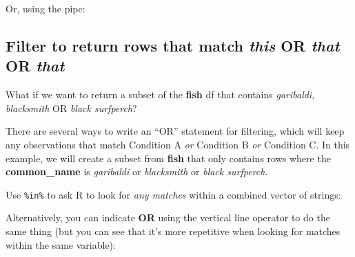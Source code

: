 \documentclass[]{book}
\newenvironment{Shaded}{\begin{snugshade}}{\end{snugshade}}
\newcommand{\DecValTok}[1]{\textcolor[rgb]{0.00,0.00,0.81}{#1}}
\newcommand{\KeywordTok}[1]{\textcolor[rgb]{0.13,0.29,0.53}{\textbf{#1}}}
\newcommand{\NormalTok}[1]{#1}
\newcommand{\OperatorTok}[1]{\textcolor[rgb]{0.81,0.36,0.00}{\textbf{#1}}}
\newcommand{\StringTok}[1]{\textcolor[rgb]{0.31,0.60,0.02}{#1}}
\begin{document}
Or, using the pipe:

\begin{Shaded}
\end{Shaded}

\hypertarget{filter-to-return-rows-that-match-this-or-that-or-that}{%
\subsection{\texorpdfstring{Filter to return rows that match \emph{this} OR \emph{that} OR \emph{that}}{Filter to return rows that match this OR that OR that}}\label{filter-to-return-rows-that-match-this-or-that-or-that}}

What if we want to return a subset of the \textbf{fish} df that contains \emph{garibaldi}, \emph{blacksmith} OR \emph{black surfperch}?

There are several ways to write an ``OR'' statement for filtering, which will keep any observations that match Condition A \emph{or} Condition B \emph{or} Condition C. In this example, we will create a subset from \textbf{fish} that only contains rows where the \textbf{common\_name} is \emph{garibaldi} or \emph{blacksmith} or \emph{black surfperch}.

Use \texttt{\%in\%} to ask R to look for \emph{any matches} within a combined vector of strings:

\begin{Shaded}
\end{Shaded}

Alternatively, you can indicate \textbf{OR} using the vertical line operator \texttt{\textbar{}} to do the same thing (but you can see that it's more repetitive when looking for matches within the same variable):

\begin{Shaded}
\end{Shaded}
\end{document}
